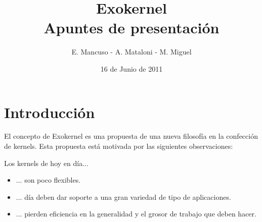 \documentclass[10pt, a4paper]{article}
\title{Exokernel \\ \small{Apuntes de presentación}}
\author{E. Mancuso - A. Mataloni - M. Miguel}
\date{16 de Junio de 2011}
\begin{document}
\maketitle

\section{Introducción}
El concepto de Exokernel es una propuesta de una nueva filosofía en la confección de kernels. Esta propuesta está motivada por las siguientes observaciones:

Los kernels de hoy en día...
\begin{itemize}
 \item ... son poco flexibles.
 \item ... día deben dar soporte a una gran variedad de tipo de aplicaciones.
 \item ... pierden eficiencia en la generalidad y el grosor de trabajo que deben hacer.
\end{itemize}
\end{document}
